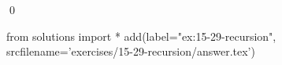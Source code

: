 
\begin{ex}
  \label{ex:15-29-recursion}
  
  \qed
\end{ex}
\begin{python0}
from solutions import *
add(label="ex:15-29-recursion",
    srcfilename='exercises/15-29-recursion/answer.tex')
\end{python0}
